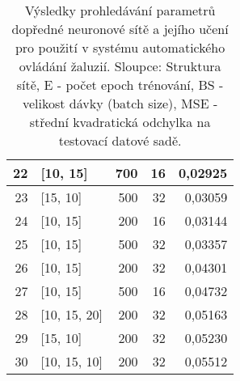 \begin{table}[htbp]
{\begin{tabular}{r|l|r|r|r}
      \midrule
      22    &  {[10, 15]} & 700   & 16    & 0,02925 \\
      \midrule
      23    &  {[15, 10]} & 500   & 32    & 0,03059 \\
      \midrule
      24    &  {[10, 15]} & 200   & 16    & 0,03144 \\
      \midrule
      25    &  {[10, 15]} & 500   & 32    & 0,03357 \\
      \midrule
      26    &  {[10, 15]} & 200   & 32    & 0,04301 \\
      \midrule
      27    &  {[10, 15]} & 500   & 16    & 0,04732 \\
      \midrule
      28    &  {[10, 15, 20]} & 200   & 32    & 0,05163 \\
      \midrule
      29    &  {[15, 10]} & 200   & 32    & 0,05230 \\
      \midrule
      30    &  {[10, 15, 10]} & 200   & 32    & 0,05512 \\
      \bottomrule
      \bottomrule
      \end{tabular}%
      }
    \caption[Výsledky prohledávání parametrů FFNN]{Výsledky prohledávání parametrů dopředné neuronové sítě a jejího učení pro použití v systému automatického ovládání žaluzií. Sloupce: Struktura sítě, E - počet epoch trénování, BS - velikost dávky (batch size), MSE - střední kvadratická odchylka na testovací datové sadě.}
    \label{tab:ffnnhyperResults}%
\end{table}%
